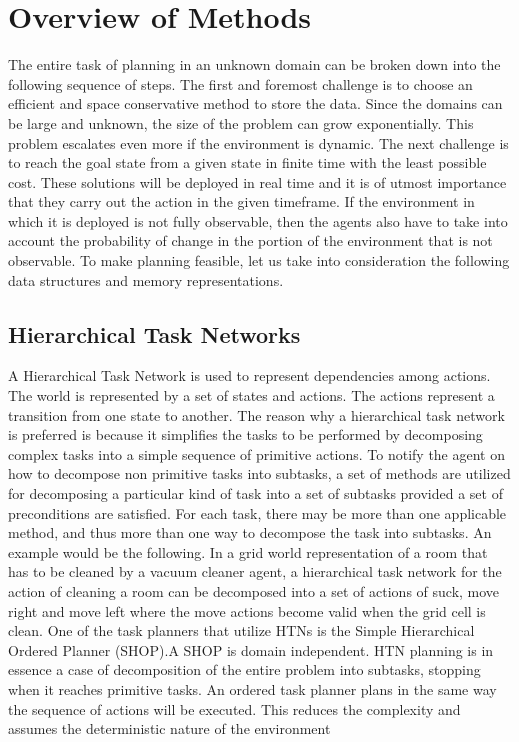 \documentclass[tog]{acmsiggraph}
\begin{document}
\section{Overview of Methods}
The entire task of planning in an unknown domain can be broken down
into the following sequence of steps. The first and foremost challenge
is to choose an efficient and space conservative method to store the
data. Since the domains can be large and unknown, the size of the
problem can grow exponentially. This problem escalates even more if
the environment is dynamic. The next challenge is to reach the goal
state from a given state in finite time with the least possible cost.
These solutions will be deployed in real time and it is of utmost
importance that they carry out the action in the given timeframe. If
the environment in which it is deployed is not fully observable, then
the agents also have to take into account the probability of change in
the portion of the environment that is not observable. To make
planning feasible, let us take into consideration the following data
structures and memory representations.

\subsection{Hierarchical Task Networks}

A Hierarchical Task Network is used to represent dependencies among
actions. The world is represented by a set of states and actions. The
actions represent a transition from one state to another. The reason
why a hierarchical task network is preferred is because it simplifies
the tasks to be performed by decomposing complex tasks into a simple
sequence of primitive actions. To notify the agent on how to decompose
non primitive tasks into subtasks, a set of methods are utilized for
decomposing a particular kind of task into a set of subtasks provided
a set of preconditions are satisfied. For each task, there may be more
than one applicable method, and thus more than one way to decompose
the task into subtasks. An example would be the following. In a grid
world representation of a room that has to be cleaned by a vacuum
cleaner agent, a hierarchical task network for the action of cleaning
a room can be decomposed into a set of actions of suck, move right and
move left where the move actions become valid when the grid cell is
clean. One of the task planners that utilize HTNs is the Simple
Hierarchical Ordered Planner (SHOP).A SHOP is domain independent. HTN
planning is in essence a case of decomposition of the entire problem
into subtasks, stopping when it reaches primitive tasks. An ordered
task planner plans in the same way the sequence of actions will be
executed. This reduces the complexity and assumes the deterministic
nature of the environment
\end{document}
